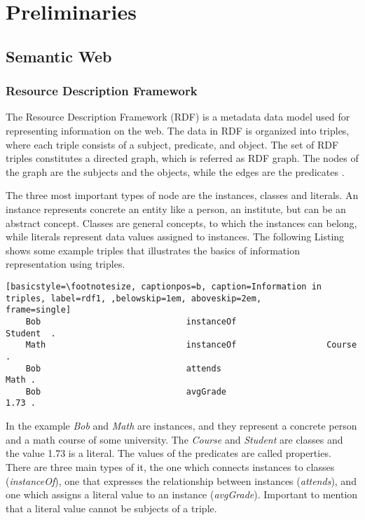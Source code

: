 \chapter{Preliminaries}

\section{Semantic Web}

\subsection{Resource Description Framework}


The Resource Description Framework (RDF) is a metadata data model used for representing information on the web. The data in RDF is organized into triples, where each triple consists of a subject, predicate, and object. The set of RDF triples constitutes a directed graph, which is referred as RDF graph. The nodes of the graph are the subjects and the objects, while the edges are the predicates \cite{Lanthaler:14:RCA}.

The three most important types of node are the instances, classes and literals. An instance represents concrete an entity like a person, an institute, but can be an abstract concept. Classes are general concepts, to which the instances can belong, while literals represent data values assigned to instances. The following Listing shows some example triples that illustrates the basics of information representation using triples.

\begin{lstlisting}[basicstyle=\footnotesize, captionpos=b, caption=Information in triples, label=rdf1, ,belowskip=1em, aboveskip=2em,
frame=single]
	Bob								instanceOf					Student  .
	Math							instanceOf					Course . 		
	Bob								attends							Math . 		
	Bob								avgGrade						1.73 .
\end{lstlisting}

In the example \textit{Bob} and \textit{Math} are instances, and they represent a concrete person and a math course of some university. The \textit{Course} and \textit{Student} are classes and the value 1.73 is a literal. The values of the predicates are called properties. There are three main types of it, the one which connects instances to classes (\textit{instanceOf}), one that expresses the relationship between instances (\textit{attends}), and one which assigns a literal value to an instance (\textit{avgGrade}). Important to mention that a literal value cannot be subjects of a triple.

